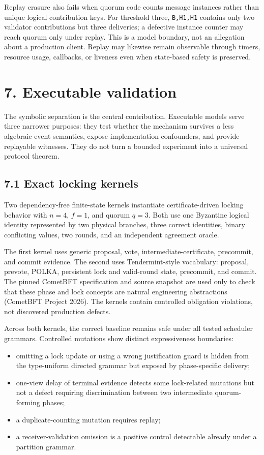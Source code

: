 \documentclass[10pt,a4paper]{article}
\newcommand{\tightlist}{\setlength{\itemsep}{0pt}\setlength{\parskip}{0pt}}
\begin{document}
Replay erasure also fails when quorum code counts message instances
rather than unique logical contribution keys. For threshold three,
\texttt{B,H1,H1} contains only two validator contributions but three
deliveries; a defective instance counter may reach quorum only under
replay. This is a model boundary, not an allegation about a production
client. Replay may likewise remain observable through timers, resource
usage, callbacks, or liveness even when state-based safety is preserved.

\section{7. Executable validation}\label{executable-validation}

The symbolic separation is the central contribution. Executable models
serve three narrower purposes: they test whether the mechanism survives
a less algebraic event semantics, expose implementation confounders, and
provide replayable witnesses. They do not turn a bounded experiment into
a universal protocol theorem.

\subsection{7.1 Exact locking kernels}\label{exact-locking-kernels}

Two dependency-free finite-state kernels instantiate certificate-driven
locking behavior with \(n=4\), \(f=1\), and quorum \(q=3\). Both use one
Byzantine logical identity represented by two physical branches, three
correct identities, binary conflicting values, two rounds, and an
independent agreement oracle.

The first kernel uses generic proposal, vote, intermediate-certificate,
precommit, and commit evidence. The second uses Tendermint-style
vocabulary: proposal, prevote, POLKA, persistent lock and valid-round
state, precommit, and commit. The pinned CometBFT specification and
source snapshot are used only to check that these phase and lock
concepts are natural engineering abstractions (CometBFT Project 2026).
The kernels contain controlled obligation violations, not discovered
production defects.

Across both kernels, the correct baseline remains safe under all tested
scheduler grammars. Controlled mutations show distinct expressiveness
boundaries:

\begin{itemize}
\tightlist
\item
  omitting a lock update or using a wrong justification guard is hidden
  from the type-uniform directed grammar but exposed by phase-specific
  delivery;
\item
  one-view delay of terminal evidence detects some lock-related
  mutations but not a defect requiring discrimination between two
  intermediate quorum-forming phases;
\item
  a duplicate-counting mutation requires replay;
\item
  a receiver-validation omission is a positive control detectable
  already under a partition grammar.
\end{itemize}
\end{document}
